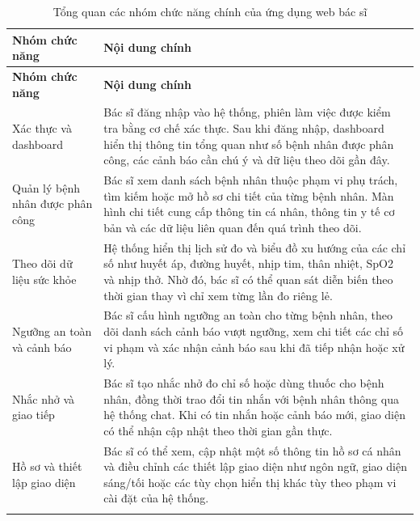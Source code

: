 \begin{center}
\renewcommand{\arraystretch}{1.25}
\begin{longtable}{|L{4.2cm}|L{10.2cm}|}
    \hline
    \textbf{Nhóm chức năng} & \textbf{Nội dung chính} \\
    \hline
    \endfirsthead
    \hline
    \textbf{Nhóm chức năng} & \textbf{Nội dung chính} \\
    \hline
    \endhead

    Xác thực và dashboard &
    Bác sĩ đăng nhập vào hệ thống, phiên làm việc được kiểm tra bằng cơ chế xác thực. Sau khi đăng nhập, dashboard hiển thị thông tin tổng quan như số bệnh nhân được phân công, các cảnh báo cần chú ý và dữ liệu theo dõi gần đây. \\
    \hline

    Quản lý bệnh nhân được phân công &
    Bác sĩ xem danh sách bệnh nhân thuộc phạm vi phụ trách, tìm kiếm hoặc mở hồ sơ chi tiết của từng bệnh nhân. Màn hình chi tiết cung cấp thông tin cá nhân, thông tin y tế cơ bản và các dữ liệu liên quan đến quá trình theo dõi. \\
    \hline

    Theo dõi dữ liệu sức khỏe &
    Hệ thống hiển thị lịch sử đo và biểu đồ xu hướng của các chỉ số như huyết áp, đường huyết, nhịp tim, thân nhiệt, SpO2 và nhịp thở. Nhờ đó, bác sĩ có thể quan sát diễn biến theo thời gian thay vì chỉ xem từng lần đo riêng lẻ. \\
    \hline

    Ngưỡng an toàn và cảnh báo &
    Bác sĩ cấu hình ngưỡng an toàn cho từng bệnh nhân, theo dõi danh sách cảnh báo vượt ngưỡng, xem chi tiết các chỉ số vi phạm và xác nhận cảnh báo sau khi đã tiếp nhận hoặc xử lý. \\
    \hline

    Nhắc nhở và giao tiếp &
    Bác sĩ tạo nhắc nhở đo chỉ số hoặc dùng thuốc cho bệnh nhân, đồng thời trao đổi tin nhắn với bệnh nhân thông qua hệ thống chat. Khi có tin nhắn hoặc cảnh báo mới, giao diện có thể nhận cập nhật theo thời gian gần thực. \\
    \hline

    Hồ sơ và thiết lập giao diện &
    Bác sĩ có thể xem, cập nhật một số thông tin hồ sơ cá nhân và điều chỉnh các thiết lập giao diện như ngôn ngữ, giao diện sáng/tối hoặc các tùy chọn hiển thị khác tùy theo phạm vi cài đặt của hệ thống. \\
    \hline

    \caption{Tổng quan các nhóm chức năng chính của ứng dụng web bác sĩ}
    \label{chapter3-table-doctor-web-functions}
\end{longtable}
\end{center}

